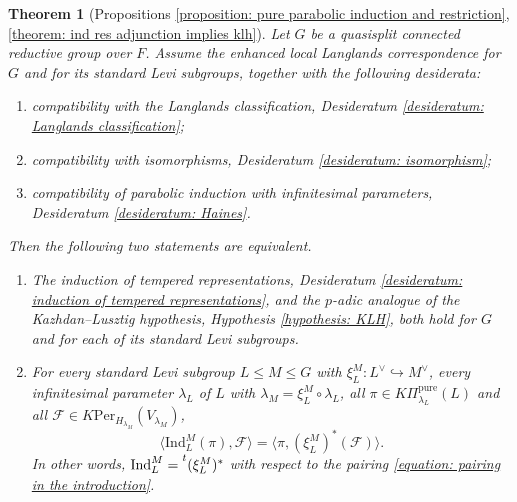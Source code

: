 \documentclass[11pt,letterpaper]{amsart}
\newcommand{\dualgroup}[1]{{#1}^\vee}
\newcommand{\pure}{\mathrm{pure}}
\newcommand{\Ind}{\mathrm{Ind}}
\newcommand{\Per}{\mathrm{Per}}
\newtheorem{thm}{Theorem}[section]
\renewcommand{\1}{\mathbbm{1}}
\numberwithin{equation}{section}
\begin{document}
\begin{thm}[{Propositions \ref{proposition: pure parabolic induction and restriction}, \ref{theorem: ind res adjunction implies klh}}]\label{theorem: main theorem in the introduction}
    Let $G$ be a quasisplit connected reductive group over $F$. Assume the enhanced local Langlands correspondence for $G$ and for its standard Levi subgroups, together with the following desiderata:
    \begin{enumerate}
        \item compatibility with the Langlands classification, Desideratum \ref{desideratum: Langlands classification};
        \item compatibility with isomorphisms, Desideratum \ref{desideratum: isomorphism};
        \item compatibility of parabolic induction with infinitesimal parameters, Desideratum \ref{desideratum: Haines}.
    \end{enumerate}
    Then the following two statements are equivalent.
    \begin{enumerate}
        \item[(a)] The induction of tempered representations, Desideratum \ref{desideratum: induction of tempered representations}, and the $p$-adic analogue of the Kazhdan--Lusztig hypothesis, Hypothesis \ref{hypothesis: KLH}, both hold for $G$ and for each of its standard Levi subgroups.
        \item[(b)] For every standard Levi subgroup $L \leq M \leq G$ with $\xi_L^M: \dualgroup{L}\hookrightarrow \dualgroup{M}$, every infinitesimal parameter $\lambda_L$ of $L$ with $\lambda_M=\xi_{L}^M\circ\lambda_L$, all $\pi\in K\Pi_{\lambda_L}^\pure(L)$ and all $\mathcal{F} \in K\Per_{H_{\lambda_M}}(V_{\lambda_M})$,
        \[\langle \Ind_{L}^M(\pi),\mathcal{F}\rangle = \langle \pi,(\xi_{L}^M)^*(\mathcal{F})\rangle.\]
        In other words, $\Ind_L^M=\prescript{t}{}{(\xi_{L}^M)^*}$ with respect to the pairing \eqref{equation: pairing in the introduction}. 
    \end{enumerate}
\end{thm}
\end{document}
